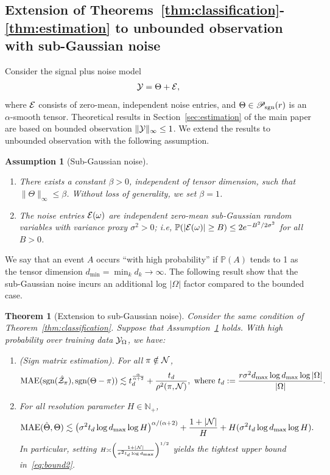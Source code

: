 \documentclass[11pt]{article}
\theoremstyle{plain}
\newtheorem{thm}{Theorem}[section]
\newtheorem{assumption}{Assumption}[section]
\theoremstyle{definition}
\def\caliP{\mathscr{P}_{\textup{sgn}}}
\begin{document}
\subsection{Extension of Theorems~\ref{thm:classification}-\ref{thm:estimation} to unbounded observation with sub-Gaussian noise}\label{sec:subGaussian}
Consider the signal plus noise model
\begin{align*}
\mathcal{Y} = \Theta+\mathcal{E},
\end{align*}
where $\mathcal{E}$ consists of zero-mean, independent noise entries, and $\Theta\in\caliP(r)$ is an $\alpha$-smooth tensor.
Theoretical results in Section~\ref{sec:estimation} of the main paper are based on bounded observation $\|\mathcal{Y}\|_\infty\leq 1$. We extend the results to unbounded observation with the following assumption.
\begin{assumption}[Sub-Gaussian noise]\label{assm:subg}\text{ }
\begin{enumerate}
\item There exists a constant $\beta>0$, independent of tensor dimension, such that $\|\Theta\|_\infty\leq \beta$. Without loss of generality, we set $\beta = 1$.
\item The noise entries $\mathcal{E}(\omega)$ are independent zero-mean sub-Gaussian random variables with variance proxy $\sigma^2>0$; i.e, $\mathbb{P}(|\mathcal{E}(\omega)|\geq B)\leq 2e^{-B^2/2\sigma^2}$ for all $B>0$.  
\end{enumerate}
\end{assumption}


We say that an event $A$ occurs ``with high probability'' if $\mathbb{P}(A)$ tends to 1 as the tensor dimension $d_{\min}=\min_k d_k\to \infty$. The following result show that the sub-Gaussian noise incurs an additional log $|\Omega|$ factor compared to the bounded case. 

\begin{thm}[Extension to sub-Gaussian noise]\label{thm:unbddno1}
Consider the same condition of Theorem~\ref{thm:classification}.  Suppose that Assumption~\ref{assm:subg} holds. With high probability over training data $\mathcal{Y}_\Omega$, we have:
\begin{enumerate}
\item [(a)](Sign matrix estimation). For all $\pi \notin\mathcal{N}$, 
\begin{align}
 \textup{MAE}(\textup{sgn}(\hat {\mathcal{Z}}_\pi),\textup{sgn}(\Theta-\pi))\lesssim t_d^{\alpha\over \alpha+2}+\frac{t_d}{\rho^2(\pi,\mathcal{N})}, \text{ where } t_d :={ r\sigma^2d_{\max}\log d_{\max}\log |\Omega|\over |\Omega|}.
\end{align}
\item[(b)] For all resolution parameter $H\in\mathbb{N}_{+}$,
\begin{equation}\label{eq:bound2}
\textup{MAE}(\hat \Theta, \Theta)\lesssim \left(\sigma^2t_d\log d_{\max}\log H\right)^{\alpha/(\alpha+2)}+{1+|\mathcal{N}|\over H}+{H( \sigma^2t_d \log d_{\max}\log H)}.
\end{equation}
In particular, setting $\scriptstyle H\asymp \left({1+|\mathcal{N}|\over \sigma^2t_d\log d_{\max}} \right)^{1/2}$ yields the tightest upper bound in~\eqref{eq:bound2}.
\end{enumerate}
\end{thm}
\end{document}
